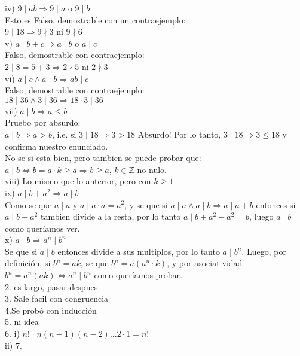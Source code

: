 \documentclass[a4paper,11pt]{article}
\begin{document}
iv) $9 \mid ab \Rightarrow 9 \mid a$ o $9 \mid b$\\
Esto es Falso, demostrable con un contraejemplo:\\
$9 \mid 18 \Rightarrow 9 \nmid 3$ ni $9 \nmid 6$\\
v) $a \mid b+c \Rightarrow a \mid b$ o $a \mid c$\\ 
Falso, demostrable con contraejemplo:\\
$2 \mid 8 = 5 + 3 \Rightarrow 2 \nmid 5$ ni $2 \nmid 3$\\
vi) $a \mid c \land a \mid b \Rightarrow ab \mid c$\\
Falso, demostrable con contraejemplo:\\
$18 \mid 36 \land 3 \mid 36 \Rightarrow 18 \cdot 3 \mid 36$\\
vii) $ a \mid b \Rightarrow a \leqslant b$ \\
Pruebo por absurdo:\\
$ a \mid b \Rightarrow a > b$, i.e. si $3 \mid 18 \Rightarrow 3 > 18$ Absurdo! Por lo tanto, $3 \mid 18 \Rightarrow 3 \leqslant 18$ y confirma nuestro enunciado.\\
No se si esta bien, pero tambien se puede probar que:\\
$a \mid b \Leftrightarrow b = a \cdot k \geqslant a \Rightarrow b \geqslant a$, $k\in\mathbb{Z}$ no nulo.\\
viii) Lo mismo que lo anterior, pero con $k \geqslant 1$\\
ix) $a \mid b + a^2 \Rightarrow a \mid b $\\
Como se que $a \mid a$ y $a \mid a \cdot a = a^2$, y se que si $a \mid a \land a \mid b \Rightarrow a \mid a + b$ entonces si $a \mid b + a^2$ tambien divide a la resta, por lo tanto $a \mid b + a^2 - a^2 = b$, luego $a \mid b$ como queríamos ver.\\
x) $a \mid b \Rightarrow a^n \mid b^n$\\
Se que si $a \mid b$ entonces divide a sus multiplos, por lo tanto $a \mid b^n$. Luego, por definición, si $b^n = ak$, se que $b^n = a(a^n \cdot k)$, y por asociatividad $b^n = a^n (ak) \Leftrightarrow a^n \mid b^n$ como queríamos probar.\\
2. es largo, pasar despues\\
3. Sale facil con congruencia\\
4.Se probó con inducción\\
5. ni idea \\
6. i) $ n! \mid n(n-1)(n-2)...2\cdot 1 = n!$\\
ii) 
7. 
\end{document}

